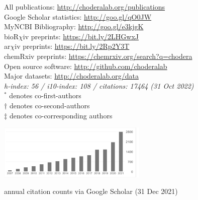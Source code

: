 \documentclass[10pt]{article}
\begin{document}
\begin{minipage}[t]{3.3in}
All publications: \href{http://choderalab.org/publications}{http://choderalab.org/publications} \\
Google Scholar statistics: \href{http://goo.gl/qO0JW}{http://goo.gl/qO0JW} \hspace{0.2in} \\
MyNCBI Bibliography: \href{http://goo.gl/e3kjgK}{http://goo.gl/e3kjgK} \\
bioR$\chi$iv preprints: \href{https://bit.ly/2LHGwxJ}{https://bit.ly/2LHGwxJ} \\
ar$\chi$iv preprints: \href{https://bit.ly/2Rp2Y3T}{https://bit.ly/2Rp2Y3T} \\
chemRxiv preprints: \href{https://chemrxiv.org/search?q=chodera}{https://chemrxiv.org/search?q=chodera} \\
Open source software: \href{http://github.com/choderalab}{http://github.com/choderalab}\\
Major datasets: \href{http://choderalab.org/data}{http://choderalab.org/data} \\
{\small \it h-index: 56 / i10-index: 108 / citations: 17464 (31 Oct 2022)} \\
{\scriptsize $^*$ denotes co-first-authors \\
$\dag$ denotes co-second-authors \\
$\ddag$ denotes co-corresponding authors}
\end{minipage}
\quad
\begin{minipage}[t]{3in}

\includegraphics[width=2.8in,valign=t]{thumbnails/citations-2021-12-31.pdf}

\vspace{0.05in}
{\small annual citation counts via Google Scholar (31 Dec 2021)}
\end{minipage}



\end{document}
